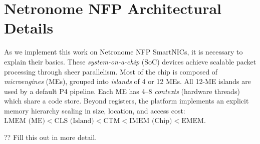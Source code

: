 \chapter{Netronome NFP Architectural Details}
\label{adx:nfp-arch}

As we implement this work on Netronome NFP SmartNICs, it is necessary to explain their basics.
These \emph{system-on-a-chip} (SoC) devices achieve scalable packet processing through sheer parallelism.
Most of the chip is composed of \emph{microengines} (MEs), grouped into \emph{islands} of 4 or 12 MEs.
All 12-ME islands are used by a default P4 pipeline.
Each ME has \numrange{4}{8} \emph{contexts} (hardware threads) which share a code store.
Beyond registers, the platform implements an explicit memory hierarchy scaling in size, location, and access cost:
$\text{LMEM (ME)} < \text{CLS (Island)} < \text{CTM} < \text{IMEM (Chip)} < \text{EMEM}$.

?? Fill this out in more detail.

